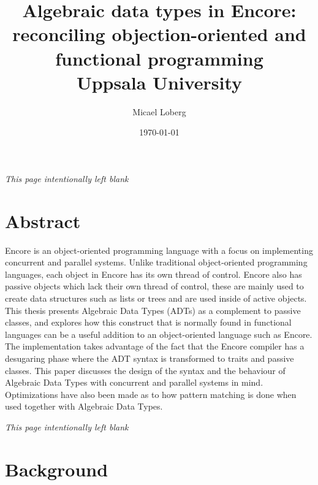 \documentclass[10pt]{report}
\title{
    {Algebraic data types in Encore:}\\
    {reconciling objection-oriented and functional programming}\\
    {Uppsala University}
}
\author{Micael Loberg}
\date{\today}
\newcommand{\KIKO}[1]{\textcolor{red}{\textbf{[Kiko: #1]}}}
\begin{document}

\maketitle

\newpage\newpage
{\centering \textit{This page intentionally left blank}\par}
\vspace{\fill}


\chapter*{Abstract}
\par{Encore is an object-oriented programming language with a focus on implementing concurrent and parallel systems. Unlike traditional object-oriented programming languages, each object in Encore has its own thread of control. Encore also has passive objects which lack their own thread of control, these are mainly used to create data structures such as lists or trees and are used inside of active objects. This thesis presents Algebraic Data Types (ADTs) as a complement to passive classes, and explores how this construct that is normally found in functional languages can be a useful addition to an object-oriented language such as Encore. The implementation takes advantage of the fact that the Encore compiler has a desugaring phase where the ADT syntax is transformed to traits and passive classes. This paper discusses the design of the syntax and the behaviour of Algebraic Data Types with concurrent and parallel systems in mind. Optimizations have also been made as to how pattern matching is done when used together with Algebraic Data Types.}

\newpage\newpage
{\centering \textit{This page intentionally left blank}\par}
\vspace{\fill}


\tableofcontents


%
\chapter{Background}
%
\setcounter{page}{1}
\end{document}
